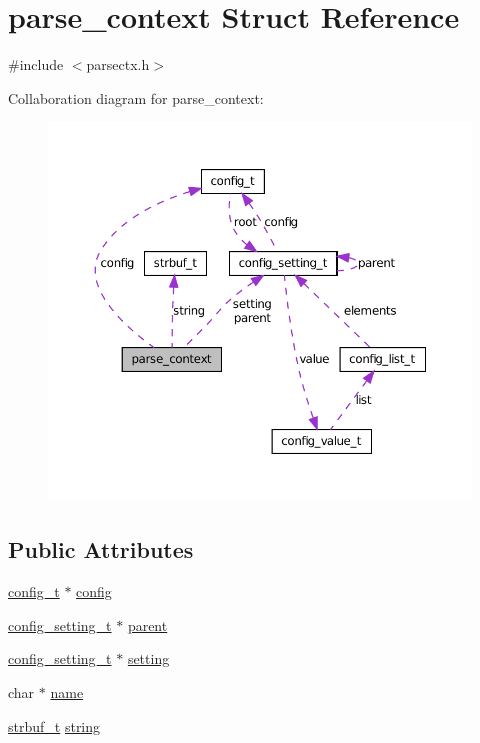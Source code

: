 \hypertarget{structparse__context}{
\section{parse\_\-context Struct Reference}
\label{structparse__context}
}


{\ttfamily \#include $<$parsectx.h$>$}



Collaboration diagram for parse\_\-context:
\nopagebreak
\begin{figure}[H]
\begin{center}
\leavevmode
\includegraphics[width=362pt]{structparse__context__coll__graph}
\end{center}
\end{figure}
\subsection*{Public Attributes}
\begin{DoxyCompactItemize}
\item 
\hyperlink{structconfig__t}{config\_\-t} $\ast$ \hyperlink{structparse__context_aa200e722cbeaa2486da5c03113a630de}{config}
\item 
\hyperlink{structconfig__setting__t}{config\_\-setting\_\-t} $\ast$ \hyperlink{structparse__context_a79ae4fb7bb22de08f7f99c8478187e22}{parent}
\item 
\hyperlink{structconfig__setting__t}{config\_\-setting\_\-t} $\ast$ \hyperlink{structparse__context_ab305aaa8de50d2803f062652b350d0e1}{setting}
\item 
char $\ast$ \hyperlink{structparse__context_a011e6f556f380ddb7ea6443310638d19}{name}
\item 
\hyperlink{structstrbuf__t}{strbuf\_\-t} \hyperlink{structparse__context_aa69b91bd3127bb918700074992130b4a}{string}
\end{DoxyCompactItemize}


